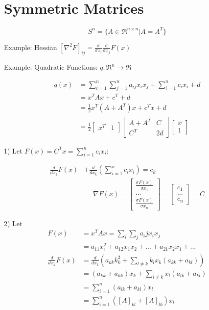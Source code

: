 
\section{Symmetric Matrices}

\begin{equation*}
S^n = \{A\in \Re^{n\times n} | A = A^T \}
\end{equation*}

Example: Hessian $[\nabla^2 F]_{ij} = \frac{\sigma}{\sigma x_i}\frac{\sigma}{\sigma x_j}F(x)$


Example: Quadratic Functions: $q: \Re^n \rightarrow \Re$

\begin{align*}
q(x) &= \sum^n_{i=1}\sum^n_{j=1}a_{ij}x_ix_j + \sum^n_{i=1}c_ix_i + d\\
&= x^TAx + c^T + d\\
&= \frac{1}{2}x^T(A + A^T)x + c^Tx + d\\
&= \frac{1}{2}
\begin{bmatrix}%
x^T& 1
\end{bmatrix}
\begin{bmatrix}%
A + A^T & C\\
C^T & 2d
\end{bmatrix}
\begin{bmatrix}%
x\\
1
\end{bmatrix}
\end{align*}


1) Let $F(x) = C^Tx = \sum^n_{i=1}c_ix_i$:

\begin{align*}
\frac{d}{dx_k}F(x) &+ \frac{d}{dx_k}(\sum^n_{i=1}c_ix_i) = c_k\\
&= \nabla F(x) = 
\begin{bmatrix}%
\frac{\sigma F(x)}{\sigma x_1}\\
...\\
\frac{\sigma F(x)}{\sigma x_n}
\end{bmatrix}=
\begin{bmatrix}%
c_1\\
...\\
c_n
\end{bmatrix} = C
\end{align*}

2) Let
\begin{align*}
F(x) &= x^TAx = \sum_i\sum_ja_ijx_ix_j\\
&= a_{11}x_1^2 + a_{12}x_1x_2 + ... + a_{21}x_2x_1 + ...\\
\frac{d}{dx_k}F(x) &= \frac{d}{dx_k}(a_{kk}k_k^2 + \sum_{l\neq k}k_lx_k(a_{kk}+a_{kl}))\\
&= (a_{kk} + a_{kk})x_k + \sum_{l\neq k}x_l(a_{lk} + a_{kl}) \\
&= \sum^n_{i=1}(a_{lk} + a_{kl})x_l\\
&= \sum^n_{i=1}([A]_{kl} + [A]_{lk})x_l
\end{align*}

